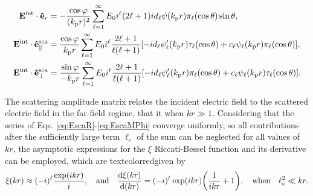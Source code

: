 \begin{subequations}\label{eq:Eint}%
\begin{align}
\vb{E}^\text{int}\cdot\vu{e}_r &=  -\frac{\cos\varphi}{(k_\text{p}r)^2}
               \sum_{\ell = 1}^\infty E_0i^\ell(2\ell+1)
               id_\ell \psi(k_\text{p}r)\pi_\ell(\cos\theta) \sin\theta ,
\label{eq:EintR}\\
\vb{E}^\text{int}\cdot\vu{e}^\text{sca}_\parallel &=  \frac{\cos\varphi}{k_\text{p}r}
               \sum_{\ell = 1}^\infty E_0i^\ell\frac{2\ell+1}{\ell(\ell+1)}
           [-i d_\ell\psi_\ell'(k_\text{p}r)\tau_\ell(\cos\theta)+c_\ell\psi_\ell(k_\text{p}r)\pi_\ell(\cos\theta)],
\label{eq:EintTheta}\\
\vb{E}^\text{int}\cdot\vu{e}^\text{sca}_\perp &=  \frac{\sin\varphi}{-k_\text{p}r}
               \sum_{\ell = 1}^\infty E_0i^\ell\frac{2\ell+1}{\ell(\ell+1)}
           [-i d_\ell\psi_\ell'(k_\text{p}r)\pi_\ell(\cos\theta)+c_\ell\psi_\ell(k_\text{p}r)\tau_\ell(\cos\theta)].
\label{eq:EintMPhi}
\end{align}%
\end{subequations}


The scattering amplitude matrix relates the incident electric field to the scattered electric field in the far-field regime, that it when $kr\gg 1$. Considering that the series of Eqs. \eqref{eq:EscaR}-\eqref{eq:EscaMPhi} converge uniformly, so all contributions after the sufficiently large  term $\ell_c$ of the sum can be neglected for all values of $kr$, the asymptotic  expressions for the $\xi$ Riccati-Bessel function and its derivative can be employed, which are textcolor{red}{given by} \cite{bohren_absorption_1983}
%
%
%
\begin{align}
\xi(kr)\approx (-i)^\ell \frac{\exp(ikr)}{i},
\qqtext{and}
\dv{\xi(kr)}{(kr)} = (-i)^\ell \exp(ikr)\qty(\frac{1}{i kr} + 1),
\qqtext{when}
\ell_c^2\ll kr.
\label{eq:RBXiAssym}
\end{align}
%

